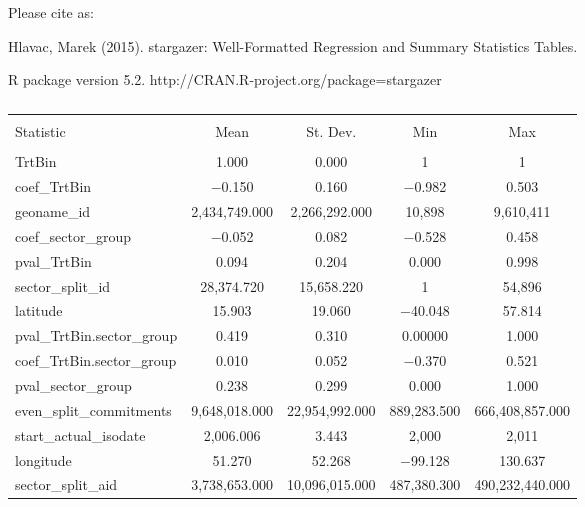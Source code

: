 \documentclass{article}\usepackage[]{graphicx}\usepackage[]{color}
\newenvironment{knitrout}{}{}  %
\begin{document}
\begin{knitrout}
\begin{Soutput}
Please cite as: 
\end{Soutput}
\begin{Soutput}
 Hlavac, Marek (2015). stargazer: Well-Formatted Regression and Summary Statistics Tables.
\end{Soutput}
\begin{Soutput}
 R package version 5.2. http://CRAN.R-project.org/package=stargazer 
\end{Soutput}

\begin{table}[!htbp] \centering 
  \caption{} 
  \label{DescStats} 
\begin{tabular}{@{\extracolsep{5pt}}lcccc} 
\\[-1.8ex]\hline 
\hline \\[-1.8ex] 
Statistic & \multicolumn{1}{c}{Mean} & \multicolumn{1}{c}{St. Dev.} & \multicolumn{1}{c}{Min} & \multicolumn{1}{c}{Max} \\ 
\hline \\[-1.8ex] 
TrtBin & 1.000 & 0.000 & 1 & 1 \\ 
coef\_TrtBin & $-$0.150 & 0.160 & $-$0.982 & 0.503 \\ 
geoname\_id & 2,434,749.000 & 2,266,292.000 & 10,898 & 9,610,411 \\ 
coef\_sector\_group & $-$0.052 & 0.082 & $-$0.528 & 0.458 \\ 
pval\_TrtBin & 0.094 & 0.204 & 0.000 & 0.998 \\ 
sector\_split\_id & 28,374.720 & 15,658.220 & 1 & 54,896 \\ 
latitude & 15.903 & 19.060 & $-$40.048 & 57.814 \\ 
pval\_TrtBin.sector\_group & 0.419 & 0.310 & 0.00000 & 1.000 \\ 
coef\_TrtBin.sector\_group & 0.010 & 0.052 & $-$0.370 & 0.521 \\ 
pval\_sector\_group & 0.238 & 0.299 & 0.000 & 1.000 \\ 
even\_split\_commitments & 9,648,018.000 & 22,954,992.000 & 889,283.500 & 666,408,857.000 \\ 
start\_actual\_isodate & 2,006.006 & 3.443 & 2,000 & 2,011 \\ 
longitude & 51.270 & 52.268 & $-$99.128 & 130.637 \\ 
sector\_split\_aid & 3,738,653.000 & 10,096,015.000 & 487,380.300 & 490,232,440.000 \\ 

\end{tabular}
\end{table}
\end{knitrout}
\end{document}
